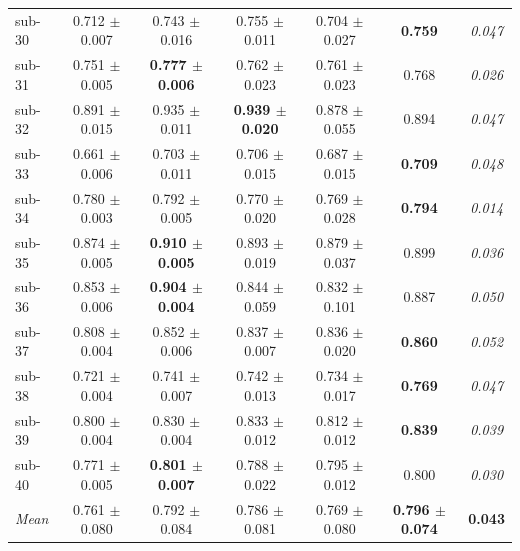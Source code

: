 \begin{table}[t]
\begin{tabular}{lcccccc}
sub-30 & 0.712 $\pm$ 0.007 & 0.743 $\pm$ 0.016 & 0.755 $\pm$ 0.011 & 0.704 $\pm$ 0.027 & \textbf{0.759} & \textit{0.047} \\
sub-31 & 0.751 $\pm$ 0.005 & \textbf{0.777 $\pm$ 0.006} & 0.762 $\pm$ 0.023 & 0.761 $\pm$ 0.023 & 0.768 & \textit{0.026} \\
sub-32 & 0.891 $\pm$ 0.015 & 0.935 $\pm$ 0.011 & \textbf{0.939 $\pm$ 0.020} & 0.878 $\pm$ 0.055 & 0.894 & \textit{0.047} \\
sub-33 & 0.661 $\pm$ 0.006 & 0.703 $\pm$ 0.011 & 0.706 $\pm$ 0.015 & 0.687 $\pm$ 0.015 & \textbf{0.709} & \textit{0.048} \\
sub-34 & 0.780 $\pm$ 0.003 & 0.792 $\pm$ 0.005 & 0.770 $\pm$ 0.020 & 0.769 $\pm$ 0.028 & \textbf{0.794} & \textit{0.014} \\
sub-35 & 0.874 $\pm$ 0.005 & \textbf{0.910 $\pm$ 0.005} & 0.893 $\pm$ 0.019 & 0.879 $\pm$ 0.037 & 0.899 & \textit{0.036} \\
sub-36 & 0.853 $\pm$ 0.006 & \textbf{0.904 $\pm$ 0.004} & 0.844 $\pm$ 0.059 & 0.832 $\pm$ 0.101 & 0.887 & \textit{0.050} \\
sub-37 & 0.808 $\pm$ 0.004 & 0.852 $\pm$ 0.006 & 0.837 $\pm$ 0.007 & 0.836 $\pm$ 0.020 & \textbf{0.860} & \textit{0.052} \\
sub-38 & 0.721 $\pm$ 0.004 & 0.741 $\pm$ 0.007 & 0.742 $\pm$ 0.013 & 0.734 $\pm$ 0.017 & \textbf{0.769} & \textit{0.047} \\
sub-39 & 0.800 $\pm$ 0.004 & 0.830 $\pm$ 0.004 & 0.833 $\pm$ 0.012 & 0.812 $\pm$ 0.012 & \textbf{0.839} & \textit{0.039} \\
sub-40 & 0.771 $\pm$ 0.005 & \textbf{0.801 $\pm$ 0.007} & 0.788 $\pm$ 0.022 & 0.795 $\pm$ 0.012 & 0.800 & \textit{0.030} \\
\midrule
\textit{Mean} & 0.761 $\pm$ 0.080 & 0.792 $\pm$ 0.084 & 0.786 $\pm$ 0.081 & 0.769 $\pm$ 0.080 & \textbf{0.796 $\pm$ 0.074} & \textbf{0.043} \\
\bottomrule
\end{tabular}
\end{table}

